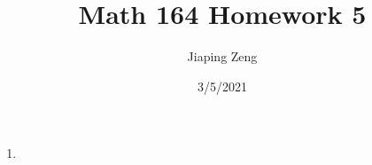 \documentclass{article}
\title{Math 164 Homework 5}
\date{3/5/2021}
\author{Jiaping Zeng}
\begin{document}
\maketitle

\begin{enumerate}
      \item
\end{enumerate}
\end{document}
